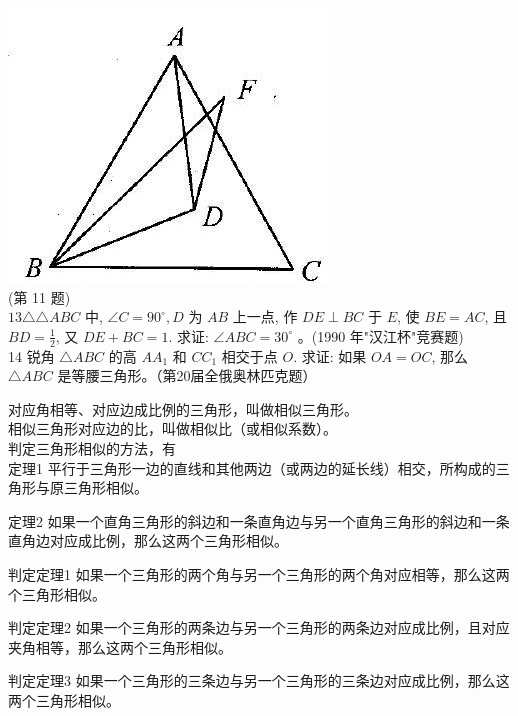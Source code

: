\documentclass[10pt]{article}
\begin{document}
\includegraphics[max width=\textwidth, center]{2024_10_30_2c8f45efd4a519b08e1ag-035}\\
(第 11 题)\\
$13 \triangle \triangle A B C$ 中, $\angle C=90^{\circ}, D$ 为 $A B$ 上一点, 作 $D E \perp B C$ 于 $E$, 使 $B E=A C$, 且 $B D=\frac{1}{2}$, 又 $D E+B C=1$. 求证: $\angle A B C=30^{\circ}$ 。(1990 年"汉江杯"竞赛题)\\
14 锐角 $\triangle A B C$ 的高 $A A_{1}$ 和 $C C_{1}$ 相交于点 $O$. 求证: 如果 $O A=O C$, 那么 $\triangle A B C$ 是等腰三角形。（第20届全俄奥林匹克题）

对应角相等、对应边成比例的三角形，叫做相似三角形。\\
相似三角形对应边的比，叫做相似比（或相似系数）。\\
判定三角形相似的方法，有\\
定理1 平行于三角形一边的直线和其他两边（或两边的延长线）相交，所构成的三角形与原三角形相似。

定理2 如果一个直角三角形的斜边和一条直角边与另一个直角三角形的斜边和一条直角边对应成比例，那么这两个三角形相似。

判定定理1 如果一个三角形的两个角与另一个三角形的两个角对应相等，那么这两个三角形相似。

判定定理2 如果一个三角形的两条边与另一个三角形的两条边对应成比例，且对应夹角相等，那么这两个三角形相似。

判定定理3 如果一个三角形的三条边与另一个三角形的三条边对应成比例，那么这两个三角形相似。
\end{document}

